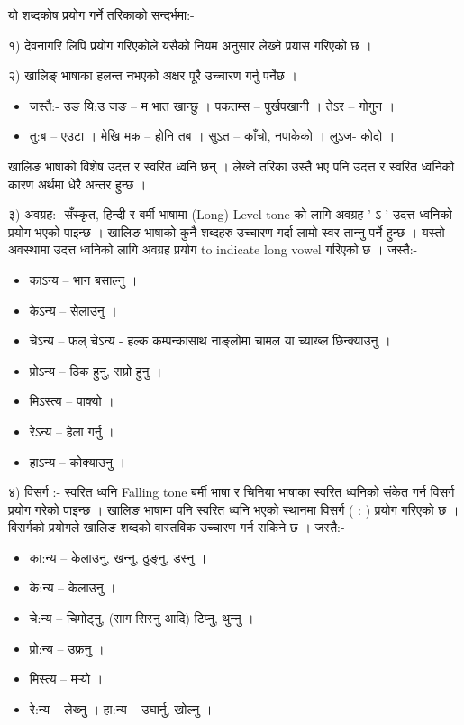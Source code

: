 \documentclass[oldfontcommands,oneside,a4paper,11pt]{article}
\begin{document}
यो शब्दकोष प्रयोग गर्ने तरिकाको सन्दर्भमा:-

१)	देवनागरि लिपि प्रयोग गरिएकोले यसैको नियम अनुसार लेख्‍ने प्रयास गरिएको छ ।

२)	खालिङ् भाषाका हलन्त नभएको अक्षर पूरै उच्‍चारण गर्नु पर्नेछ । 
\begin{itemize}
\item जस्तै:- उङ यि:उ जङ – म भात खान्छु । पकतम्स – पुर्खपखानी । तेऽर – गोगुन ।
\item  तु:ब – एउटा । मेखि मक – होनि तब । सुऽत – काँचो, नपाकेको । लुऽज- कोदो । 
\end{itemize}
खालिङ भाषाको विशेष उदत्त र स्वरित ध्वनि छन् । लेख्‍ने तरिका उस्तै भए पनि उदत्त र स्वरित ध्वनिको कारण अर्थमा धेरै अन्तर हुन्छ ।

३) अवग्रह:- सँस्कृत, हिन्दी र बर्मी भाषामा (Long) Level tone को लागि अवग्रह  ' ऽ ' उदत्त ध्वनिको प्रयोग भएको पाइन्छ । खालिङ भाषाको कुनै शब्दहरु उच्‍चारण गर्दा लामो स्वर तान्‍नु पर्ने हुन्छ । यस्तो अवस्थामा उदत्त ध्वनिको लागि अवग्रह प्रयोग to indicate long vowel गरिएको छ । जस्तै:-
\begin{itemize}
\item काऽन्य – भान बसाल्‍नु ।
\item केऽन्य – सेलाउनु ।
\item चेऽन्य – फल् चेऽन्य - हल्क कम्पन्कासाथ नाङ्लोमा चामल या च्याख्ल छिन्क्याउनु ।
\item प्रोऽन्य – ठिक हुनु, राम्रो हुनु ।
\item मिऽस्त्य – पाक्यो । 
\item रेऽन्य – हेला गर्नु ।
\item हाऽन्य – कोक्याउनु ।
\end{itemize}

४) विसर्ग :-	 स्वरित ध्वनि Falling tone
बर्मी भाषा र चिनिया भाषाका स्वरित ध्वनिको संकेत गर्न विसर्ग प्रयोग गरेको पाइन्छ । खालिङ भाषामा पनि स्वरित ध्वनि भएको स्थानमा विसर्ग ( : ) प्रयोग गरिएको छ । विसर्गको प्रयोगले खालिङ शब्दको वास्तविक उच्‍चारण गर्न सकिने छ । 
जस्तै:-
\begin{itemize}
\item  का:न्य – केलाउनु, खन्‍नु, ठुङ्‍नु, डस्‍नु ।
\item  के:न्य – केलाउनु ।
\item  चे:न्य – चिमोट्‍नु, (साग सिस्‍नु आदि) टिप्‍नु, थुन्‍नु ।
\item  प्रो:न्य – उफ्रनु । 
\item  मिस्त्य –  मर्‍यो ।
\item  रे:न्य – लेख्‍नु । 
हा:न्य – उघार्नु, खोल्‍नु ।
\end{itemize}
\end{document}
